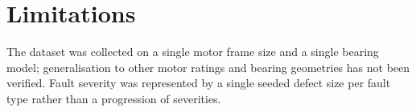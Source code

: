 \section{Limitations}
The dataset was collected on a single motor frame size and a single bearing model; generalisation
to other motor ratings and bearing geometries has not been verified. Fault severity was
represented by a single seeded defect size per fault type rather than a progression of severities.
